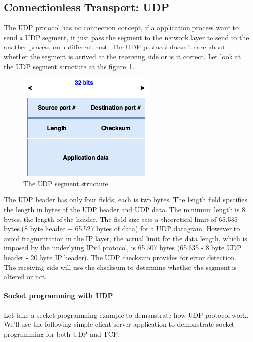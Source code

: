 \documentclass[a4paper, 11pt]{article}
\begin{document}
\subsection{Connectionless Transport: UDP}
The UDP protocol has no connection concept, if a application process want to send a UDP segment, it just pass the segment to the network layer to send to the another process on a different host. The UDP protocol doesn't care about whether the segment is arrived at the receiving side or is it correct. Let look at the UDP segment structure at the figure~\ref{fig:UDP-segment}.

\begin{figure}[h]
\includegraphics[scale=0.6]{UDP-segment.png}
\caption{The UDP segment structure}
\label{fig:UDP-segment}
\end{figure}

The UDP header has only four fields, each is two bytes. The length field specifies the length in bytes of the UDP header and UDP data. The minimum length is 8 bytes, the length of the header. The field size sets a theoretical limit of 65.535 bytes (8 byte header + 65.527 bytes of data) for a UDP datagram. However to avoid fragmentation in the IP layer, the actual limit for the data length, which is imposed by the underlying IPv4 protocol, is 65.507 bytes (65.535 - 8 byte UDP header - 20 byte IP header). The UDP checksum provides for error detection. The receiving side will use the checksum to determine whether the segment is altered or not.\\

\paragraph{Socket programming with UDP}
Let take a socket programming example to demonstrate how UDP protocol work.\\

We’ll use the following simple client-server application to demonstrate socket programming for both UDP and TCP:
\end{document}
